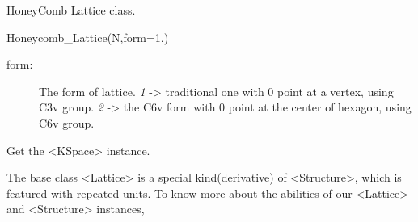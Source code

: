 \documentclass[letterpaper,10pt,oneside,openany]{sphinxmanual}
\begin{document}
\begin{fulllineitems}
\label{index:lattice.latticelib.Honeycomb_Lattice}
HoneyComb Lattice class.

Honeycomb\_Lattice(N,form=1.)
\begin{description}
\item[{form:}] \leavevmode
The form of lattice.
\emph{1} -\textgreater{} traditional one with 0 point at a vertex, using C3v group.
\emph{2} -\textgreater{} the C6v form with 0 point at the center of hexagon, using C6v group.

\end{description}

\begin{fulllineitems}
\label{index:lattice.latticelib.Honeycomb_Lattice.kspace}
Get the \textless{}KSpace\textgreater{} instance.

\end{fulllineitems}


\end{fulllineitems}


The base class \textless{}Lattice\textgreater{} is a special kind(derivative) of \textless{}Structure\textgreater{}, which is featured with repeated units.
To know more about the abilities of our \textless{}Lattice\textgreater{} and \textless{}Structure\textgreater{} instances,
\end{document}
